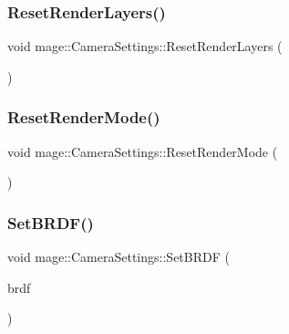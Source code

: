 \subsubsection{\texorpdfstring{Reset\+Render\+Layers()}{ResetRenderLayers()}}
{\footnotesize\ttfamily void mage\+::\+Camera\+Settings\+::\+Reset\+Render\+Layers (\begin{DoxyParamCaption}{ }\end{DoxyParamCaption})\hspace{0.3cm}{\ttfamily [noexcept]}}

\hypertarget{classmage_1_1_camera_settings_aa8facc0ddcd3e3d9f3c05c9f44c77b5d}{}\label{classmage_1_1_camera_settings_aa8facc0ddcd3e3d9f3c05c9f44c77b5d} 
\subsubsection{\texorpdfstring{Reset\+Render\+Mode()}{ResetRenderMode()}}
{\footnotesize\ttfamily void mage\+::\+Camera\+Settings\+::\+Reset\+Render\+Mode (\begin{DoxyParamCaption}{ }\end{DoxyParamCaption})\hspace{0.3cm}{\ttfamily [noexcept]}}

\hypertarget{classmage_1_1_camera_settings_a8fbc3d6013d5f711decaf6f7348f2e15}{}\label{classmage_1_1_camera_settings_a8fbc3d6013d5f711decaf6f7348f2e15} 
\subsubsection{\texorpdfstring{Set\+B\+R\+D\+F()}{SetBRDF()}}
{\footnotesize\ttfamily void mage\+::\+Camera\+Settings\+::\+Set\+B\+R\+DF (\begin{DoxyParamCaption}\item[{\hyperlink{namespacemage_af1044f87544bc38427766a8c795d2f26}{B\+R\+D\+F\+Type}}]{brdf }\end{DoxyParamCaption})\hspace{0.3cm}{\ttfamily [noexcept]}}

\hypertarget{classmage_1_1_camera_settings_ab0d6720a08e88e018c2a2e6097933d98}{}\label{classmage_1_1_camera_settings_ab0d6720a08e88e018c2a2e6097933d98} 
